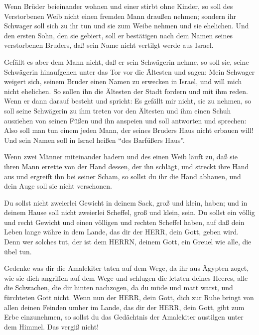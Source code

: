  Wenn Brüder beieinander wohnen und einer stirbt ohne
Kinder, so soll des Verstorbenen Weib nicht einen fremden Mann draußen
nehmen; sondern ihr Schwager soll sich zu ihr tun und sie zum Weibe
nehmen und sie ehelichen.  Und den ersten Sohn, den sie
gebiert, soll er bestätigen nach dem Namen seines verstorbenen Bruders,
daß sein Name nicht vertilgt werde aus Israel.

 Gefällt es aber dem Mann nicht, daß er sein Schwägerin
nehme, so soll sie, seine Schwägerin hinaufgehen unter das Tor vor die
Ältesten und sagen: Mein Schwager weigert sich, seinem Bruder einen
Namen zu erwecken in Israel, und will mich nicht ehelichen. 
So sollen ihn die Ältesten der Stadt fordern und mit ihm reden. Wenn er
dann darauf besteht und spricht: Es gefällt mir nicht, sie zu nehmen,
 so soll seine Schwägerin zu ihm treten vor den Ältesten und
ihm einen Schuh ausziehen von seinen Füßen und ihn anspeien und soll
antworten und sprechen: Also soll man tun einem jeden Mann, der seines
Bruders Haus nicht erbauen will!  Und sein Namen soll in
Israel heißen ``des Barfüßers Haus''.

 Wenn zwei Männer miteinander hadern und des einen Weib
läuft zu, daß sie ihren Mann errette von der Hand dessen, der ihn
schlägt, und streckt ihre Hand aus und ergreift ihn bei seiner Scham,
 so sollst du ihr die Hand abhauen, und dein Auge soll sie
nicht verschonen.

 Du sollst nicht zweierlei Gewicht in deinem Sack, groß und
klein, haben;  und in deinem Hause soll nicht zweierlei
Scheffel, groß und klein, sein.  Du sollst ein völlig und
recht Gewicht und einen völligen und rechten Scheffel haben, auf daß
dein Leben lange währe in dem Lande, das dir der HERR, dein Gott, geben
wird.  Denn wer solches tut, der ist dem HERRN, deinem
Gott, ein Greuel wie alle, die übel tun.

 Gedenke was dir die Amalekiter taten auf dem Wege, da ihr
aus Ägypten zoget,  wie sie dich angriffen auf dem Wege und
schlugen die letzten deines Heeres, alle die Schwachen, die dir hinten
nachzogen, da du müde und matt warst, und fürchteten Gott nicht.
 Wenn nun der HERR, dein Gott, dich zur Ruhe bringt von
allen deinen Feinden umher im Lande, das dir der HERR, dein Gott, gibt
zum Erbe einzunehmen, so sollst du das Gedächtnis der Amalekiter
austilgen unter dem Himmel. Das vergiß nicht!


